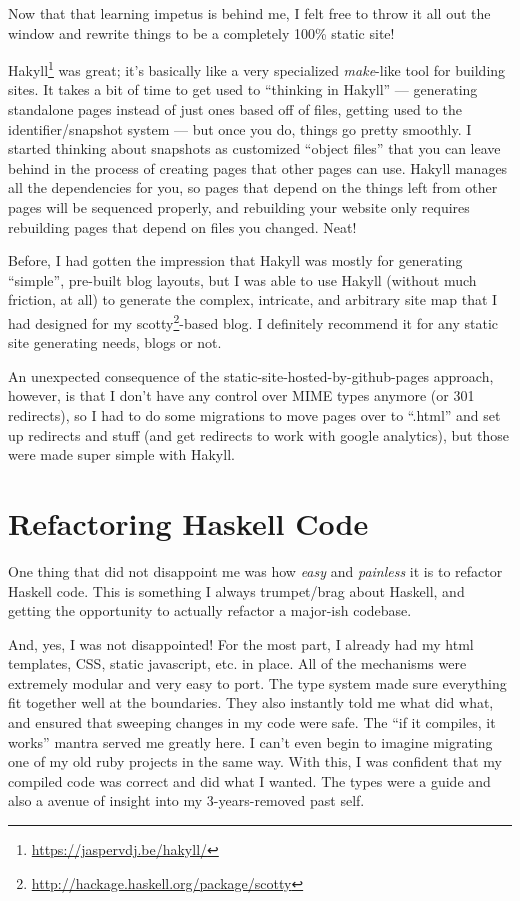 \documentclass[]{article}
\renewcommand{\href}[2]{#2\footnote{\url{#1}}}
\begin{document}
Now that that learning impetus is behind me, I felt free to throw it all out the
window and rewrite things to be a completely 100\% static site!

\href{https://jaspervdj.be/hakyll/}{Hakyll} was great; it's basically like a
very specialized \emph{make}-like tool for building sites. It takes a bit of
time to get used to ``thinking in Hakyll'' --- generating standalone pages
instead of just ones based off of files, getting used to the identifier/snapshot
system --- but once you do, things go pretty smoothly. I started thinking about
snapshots as customized ``object files'' that you can leave behind in the
process of creating pages that other pages can use. Hakyll manages all the
dependencies for you, so pages that depend on the things left from other pages
will be sequenced properly, and rebuilding your website only requires rebuilding
pages that depend on files you changed. Neat!

Before, I had gotten the impression that Hakyll was mostly for generating
``simple'', pre-built blog layouts, but I was able to use Hakyll (without much
friction, at all) to generate the complex, intricate, and arbitrary site map
that I had designed for my
\href{http://hackage.haskell.org/package/scotty}{scotty}-based blog. I
definitely recommend it for any static site generating needs, blogs or not.

An unexpected consequence of the static-site-hosted-by-github-pages approach,
however, is that I don't have any control over MIME types anymore (or 301
redirects), so I had to do some migrations to move pages over to ``.html'' and
set up redirects and stuff (and get redirects to work with google analytics),
but those were made super simple with Hakyll.

\hypertarget{refactoring-haskell-code}{%
\section{Refactoring Haskell Code}\label{refactoring-haskell-code}}

One thing that did not disappoint me was how \emph{easy} and \emph{painless} it
is to refactor Haskell code. This is something I always trumpet/brag about
Haskell, and getting the opportunity to actually refactor a major-ish codebase.

And, yes, I was not disappointed! For the most part, I already had my html
templates, CSS, static javascript, etc. in place. All of the mechanisms were
extremely modular and very easy to port. The type system made sure everything
fit together well at the boundaries. They also instantly told me what did what,
and ensured that sweeping changes in my code were safe. The ``if it compiles, it
works'' mantra served me greatly here. I can't even begin to imagine migrating
one of my old ruby projects in the same way. With this, I was confident that my
compiled code was correct and did what I wanted. The types were a guide and also
a avenue of insight into my 3-years-removed past self.
\end{document}
